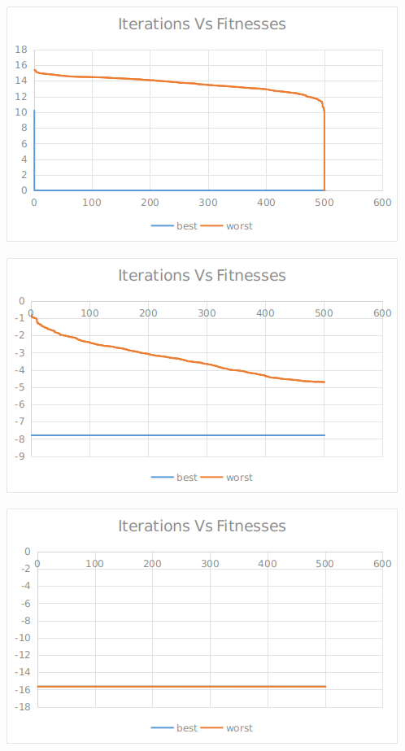 \documentclass[12pt]{article}
\begin{document}
					\hfill
					\begin{minipage}{0.6\linewidth}
						\includegraphics[width=\linewidth]{48.png}
					\end{minipage}
					\begin{minipage}{0.6\linewidth}
						\includegraphics[width=\linewidth]{49.png}
					\end{minipage}
					\hfill
					\begin{minipage}{0.6\linewidth}
						\includegraphics[width=\linewidth]{50.png}
					\end{minipage}
\end{document}
